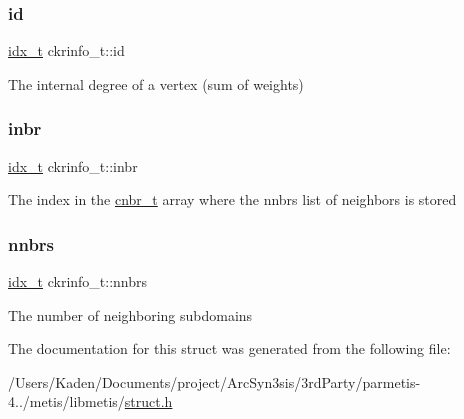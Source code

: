 \subsubsection{\texorpdfstring{id}{id}}
{\footnotesize\ttfamily \hyperlink{a00876_aaa5262be3e700770163401acb0150f52}{idx\+\_\+t} ckrinfo\+\_\+t\+::id}

The internal degree of a vertex (sum of weights) \mbox{\label{a00718_aca4e2d97adbc1b6401b4ee8acba70770}} 
\subsubsection{\texorpdfstring{inbr}{inbr}}
{\footnotesize\ttfamily \hyperlink{a00876_aaa5262be3e700770163401acb0150f52}{idx\+\_\+t} ckrinfo\+\_\+t\+::inbr}

The index in the \hyperlink{a00714}{cnbr\+\_\+t} array where the nnbrs list of neighbors is stored \mbox{\label{a00718_a73fbc8555b843b3fd414ac0a9ec244f1}} 
\subsubsection{\texorpdfstring{nnbrs}{nnbrs}}
{\footnotesize\ttfamily \hyperlink{a00876_aaa5262be3e700770163401acb0150f52}{idx\+\_\+t} ckrinfo\+\_\+t\+::nnbrs}

The number of neighboring subdomains 

The documentation for this struct was generated from the following file\+:\begin{DoxyCompactItemize}
\item 
/\+Users/\+Kaden/\+Documents/project/\+Arc\+Syn3sis/3rd\+Party/parmetis-\/4../metis/libmetis/\hyperlink{a00972}{struct.\+h}\end{DoxyCompactItemize}
